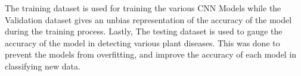 The training dataset is used for training the various CNN Models while the Validation dataset 
gives an unbias representation of the accuracy of the model during the training process. Lastly, 
The testing dataset is used to gauge the accuracy of the model in detecting various plant diseases.
This was done to prevent the models from overfitting, and improve 
the accuracy of each model in classifying new data. 



